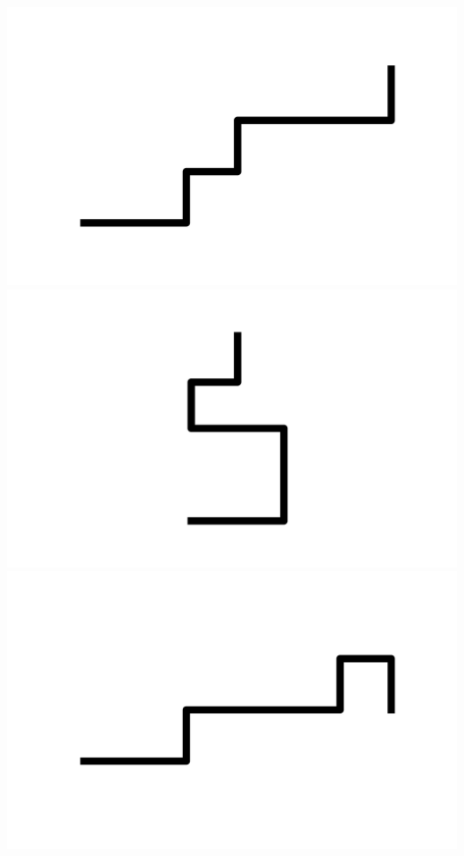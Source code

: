 \documentclass[]{report}
\begin{document}
\includegraphics[scale=.1]{pictures/21/state_cluster_shapes_208.pdf} 
\includegraphics[scale=.1]{pictures/21/state_cluster_shapes_209.pdf} 
\includegraphics[scale=.1]{pictures/21/state_cluster_shapes_210.pdf} 
\end{document}
